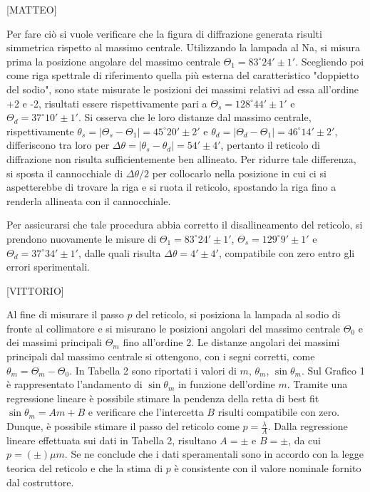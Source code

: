 \documentclass{article}
\begin{document}
	
 [MATTEO]
 
 
Per fare ciò si vuole verificare che la figura di diffrazione generata risulti simmetrica rispetto al massimo centrale.
Utilizzando la lampada al Na, si misura prima la posizione angolare del massimo centrale $\Theta_1 = 83^\circ 24' \pm 1'$.
Scegliendo poi come riga spettrale di riferimento quella più esterna del caratteristico "doppietto del sodio", sono state misurate le posizioni dei massimi relativi ad essa all'ordine +2 e -2, risultati essere rispettivamente pari a $\Theta_s = 128^\circ 44' \pm 1'$ e $\Theta_d = 37^\circ 10' \pm 1'$.
Si osserva che le loro distanze dal massimo centrale, rispettivamente $\theta_s = |\Theta_s - \Theta_1| = 45^\circ20' \pm 2'$ e $\theta_d = |\Theta_d - \Theta_1| = 46^\circ 14' \pm 2'$, differiscono tra loro per $\Delta\theta = |\theta_s - \theta_d| = 54' \pm 4'$, pertanto il reticolo di diffrazione non risulta sufficientemente ben allineato.
Per ridurre tale differenza, si sposta il cannocchiale di $\Delta\theta/2$ per collocarlo nella posizione in cui ci si aspetterebbe di trovare la riga e si ruota il reticolo, spostando la riga fino a renderla allineata con il cannocchiale.

Per assicurarsi che tale procedura abbia corretto il disallineamento del reticolo, si prendono nuovamente le misure di $\Theta_1 = 83^\circ 24' \pm 1'$, $\Theta_s = 129^\circ 9' \pm 1'$ e $\Theta_d = 37^\circ 34' \pm 1'$, dalle quali risulta $\Delta\theta = 4' \pm 4'$, compatibile con zero entro gli errori sperimentali.



[VITTORIO]

Al fine di misurare il passo $p$ del reticolo, si posiziona la lampada al sodio di fronte al collimatore e si misurano le posizioni angolari del massimo centrale $\Theta_0$ e dei massimi principali $\Theta_m$ fino all'ordine 2. Le distanze angolari dei massimi principali dal massimo centrale si ottengono, con i segni corretti, come $\theta_m = \Theta_m - \Theta_0$. In Tabella 2 sono riportati i valori di $m$, $\theta_m$, $\sin \theta_m$. Sul Grafico 1 è rappresentato l'andamento di $\sin \theta_m$ in funzione dell'ordine $m$. Tramite una regressione lineare è possibile stimare la pendenza della retta di best fit $\sin \theta_m = Am + B$ e verificare che l'intercetta $B$ risulti compatibile con zero. Dunque, è possibile stimare il passo del reticolo come $p=\frac{\lambda}{A}$. Dalla regressione lineare effettuata sui dati in Tabella 2, risultano $A=\pm$ e $B=\pm$, da cui $p=(\pm)\mu m$. Se ne conclude che i dati speramentali sono in accordo con la legge teorica del reticolo e che la stima di $p$ è consistente con il valore nominale fornito dal costruttore.
\end{document}
